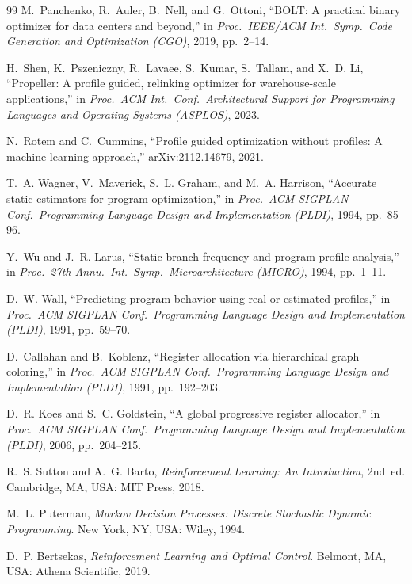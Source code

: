 \documentclass{ieeeaccess}
\begin{document}
\begin{thebibliography}{99}
M.~Panchenko, R.~Auler, B.~Nell, and G.~Ottoni, ``BOLT: A practical
binary optimizer for data centers and beyond,'' in \emph{Proc.\
IEEE/ACM Int.\ Symp.\ Code Generation and Optimization (CGO)}, 2019,
pp.~2--14.

H.~Shen, K.~Pszeniczny, R.~Lavaee, S.~Kumar, S.~Tallam, and X.~D. Li,
``Propeller: A profile guided, relinking optimizer for warehouse-scale
applications,'' in \emph{Proc.\ ACM Int.\ Conf.\ Architectural Support
for Programming Languages and Operating Systems (ASPLOS)}, 2023.

N.~Rotem and C.~Cummins, ``Profile guided optimization without
profiles: A machine learning approach,'' arXiv:2112.14679, 2021.

T.~A. Wagner, V.~Maverick, S.~L. Graham, and M.~A. Harrison,
``Accurate static estimators for program optimization,'' in
\emph{Proc.\ ACM SIGPLAN Conf.\ Programming Language Design and
Implementation (PLDI)}, 1994, pp.~85--96.

Y.~Wu and J.~R. Larus, ``Static branch frequency and program profile
analysis,'' in \emph{Proc.\ 27th Annu.\ Int.\ Symp.\ Microarchitecture
(MICRO)}, 1994, pp.~1--11.

D.~W. Wall, ``Predicting program behavior using real or estimated
profiles,'' in \emph{Proc.\ ACM SIGPLAN Conf.\ Programming Language
Design and Implementation (PLDI)}, 1991, pp.~59--70.

D.~Callahan and B.~Koblenz, ``Register allocation via hierarchical
graph coloring,'' in \emph{Proc.\ ACM SIGPLAN Conf.\ Programming Language
Design and Implementation (PLDI)}, 1991, pp.~192--203.

D.~R. Koes and S.~C. Goldstein, ``A global progressive register
allocator,'' in \emph{Proc.\ ACM SIGPLAN Conf.\ Programming Language
Design and Implementation (PLDI)}, 2006, pp.~204--215.

R.~S. Sutton and A.~G. Barto, \emph{Reinforcement Learning: An
Introduction}, 2nd~ed. Cambridge, MA, USA: MIT Press, 2018.

M.~L. Puterman, \emph{Markov Decision Processes: Discrete Stochastic
Dynamic Programming}. New York, NY, USA: Wiley, 1994.

D.~P. Bertsekas, \emph{Reinforcement Learning and Optimal Control}.
Belmont, MA, USA: Athena Scientific, 2019.


\end{thebibliography}
\end{document}
